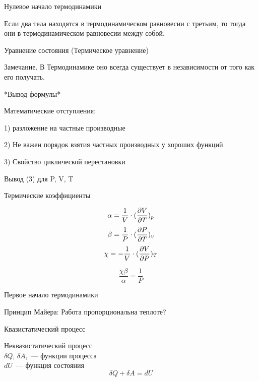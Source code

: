 \documentclass[../main.tex]{subfiles}
\begin{document}
    Нулевое начало термодинамики

    Если два тела находятся в термодинамическом равновесии с третьим, то тогда они в термодинамическом равновесии между собой.
    
    Уравнение состояния (Термическое уравнение)

    Замечание. В Термодинамике оно всегда существует в независимости от того как его получать.

    *Вывод формулы*

    Математические отступления:

        1) разложение на частные производные

        2) Не важен порядок взятия частных производных у хороших функций

        3) Свойство циклической перестановки

    Вывод (3) для P, V, T

    Термические коэффициенты

    $$\displaystyle \alpha = \frac{1}{V} \cdot (\frac{\partial V}{\partial T})_{p} \\$$
    $$\displaystyle \beta = \frac{1}{P} \cdot (\frac{\partial P}{\partial T})_{v} \\$$
    $$\displaystyle \chi = - \frac{1}{V} \cdot (\frac{\partial V}{\partial P})_{T} \\$$

    $$\displaystyle \frac{\chi \beta}{\alpha} = \frac{1}{P}$$

    Первое начало термодинамики 

    Принцип Майера: Работа пропорциональна теплоте?

    Квазистатический процесс

    Неквазистатический процесс\\
    $\delta Q$, $\delta A$,~--- функции процесса\\
    $dU$~--- функция состояния\\

    $$ \delta Q + \delta A = dU$$
\end{document}
